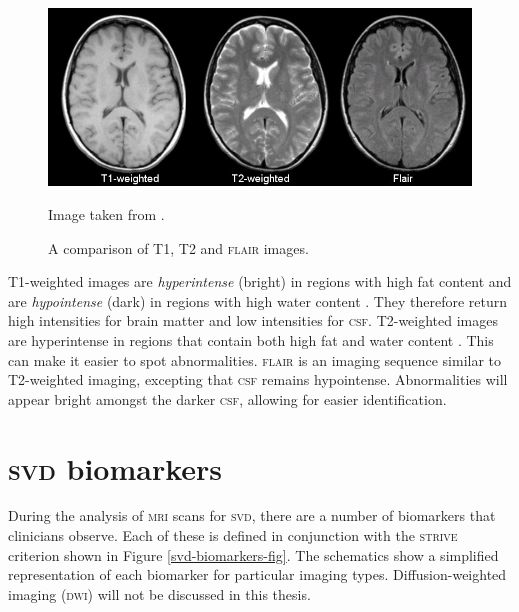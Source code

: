 \begin{figure}[ht]
	\centering
	\includegraphics[width=\textwidth]{Images/2_t1_t2_flair.jpg}
	\caption{A comparison of T1, T2 and \textsc{flair} images.}
	\small Image taken from \cite{Preston2006}.
	\label{svd-t1-vs-t2}
\end{figure}

T1-weighted images are \textit{hyperintense} (bright) in regions with high fat content and are \textit{hypointense} (dark) in regions with high water content \citep{Bitar2006}. They therefore return high intensities for brain matter and low intensities for \textsc{csf}. T2-weighted images are hyperintense in regions that contain both high fat and water content \citep{Bitar2006}. This can make it easier to spot abnormalities. \textsc{flair} is an imaging sequence similar to T2-weighted imaging, excepting that \textsc{csf} remains hypointense. Abnormalities will appear bright amongst the darker \textsc{csf}, allowing for easier identification.

\section{\textsc{svd} biomarkers}\label{svd-markers}

During the analysis of \textsc{mri} scans for \textsc{svd}, there are a number of biomarkers that clinicians observe. Each of these is defined in conjunction with the \textsc{strive} criterion \citep{WardlawJ.M.2013Nsfr} shown in Figure \ref{svd-biomarkers-fig}. The schematics show a simplified representation of each biomarker for particular imaging types. Diffusion-weighted imaging (\textsc{dwi}) will not be discussed in this thesis. 

